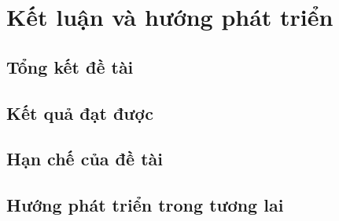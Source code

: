 \chapter{Kết luận và hướng phát triển}
\label{chap:ket-luan-huong-phat-trien}

\section{Tổng kết đề tài}
\label{sec:tong-ket-de-tai}

\section{Kết quả đạt được}
\label{sec:ket-qua-dat-duoc}

\section{Hạn chế của đề tài}
\label{sec:han-che-de-tai}

\section{Hướng phát triển trong tương lai}
\label{sec:huong-phat-trien}
